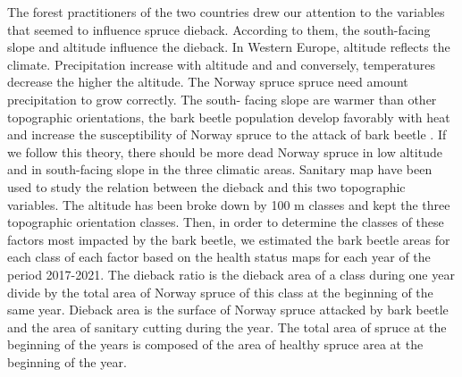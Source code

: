 \documentclass[3p,procedia]{elsarticle}
\begin{document}

The forest practitioners of the two countries drew our attention to the variables that seemed to influence spruce dieback.
According to them, the south-facing slope and altitude influence the dieback.
In Western Europe, altitude reflects the climate. Precipitation increase with altitude and and conversely, temperatures decrease the higher the altitude.
The Norway spruce spruce need amount precipitation to grow correctly.
The south- facing slope are warmer than other topographic orientations, the bark beetle 
population develop favorably with heat \citep{annila_influence_1969, baier_phenipscomprehensive_2007, jonsson_2009, marini_climate_2012} and increase the susceptibility of Norway spruce to the attack of bark beetle \citep{wermelinger_ecology_2004, netherer_waterlimiting_2015}.
If we follow this theory, there should be more dead Norway spruce in low altitude and in south-facing slope in the three climatic areas.  
Sanitary map have been used to study the relation between the dieback and this two topographic variables.
The altitude has been broke down  by 100 m classes and kept the three topographic orientation classes.
Then, in order to determine the classes of these factors most impacted by the bark beetle, we estimated the bark beetle areas for each class of each factor based on the health status maps for each year of the period 2017-2021.
The dieback ratio is  the dieback area of a class during one year divide by the total area of Norway spruce of this class at the beginning of the same year. 
Dieback area is the surface of Norway spruce attacked by bark beetle and the area of sanitary cutting during the year. 
The total area of spruce at the beginning of the years is composed of the area of healthy spruce area at the beginning of the year. 


\end{document}
